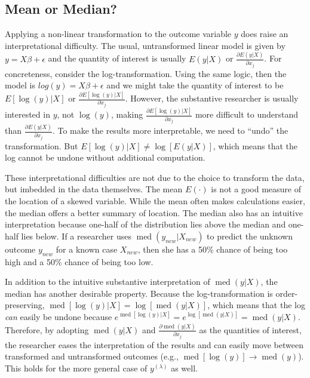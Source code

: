 \documentclass[12pt]{article}
\DeclareMathOperator{\med}{med}
\begin{document}
\subsection*{Mean or Median?}

Applying a non-linear transformation to the outcome variable $y$ does raise an interpretational difficulty. 
The usual, untransformed linear model is given by $y = X\beta + \epsilon$ and the quantity of interest is usually $E(y | X)$ or $\frac{\partial E(y | X)}{\partial x_j}$. 
For concreteness, consider the log-transformation. 
Using the same logic, then the model is $log(y) = X\beta + \epsilon$ and we might take the quantity of interest to be $E[\log(y) | X]$ or $\frac{\partial E[\log(y) | X]}{\partial x_j}$. 
However, the substantive researcher is usually interested in $y$, not $\log(y)$, making $\frac{\partial E[\log(y) | X]}{\partial x_j}$ more difficult to understand than $\frac{\partial E(y | X)}{\partial x_j}$. 
To make the results more interpretable, we need to ``undo'' the transformation. 
But $E[\log(y) | X] \neq \log [E(y | X)]$, which means that the log cannot be undone without additional computation.

These interpretational difficulties are not due to the choice to transform the data, but imbedded in the data themselves. 
The mean $E(\cdot)$ is not a good measure of the location of a skewed variable. 
While the mean often makes calculations easier, the median offers a better summary of location. 
The median also has an intuitive interpretation because one-half of the distribution lies above the median and one-half lies below. 
If a researcher uses $\med(y_{new} | X_{new})$ to predict the unknown outcome $y_{new}$ for a known case $X_{new}$, then she has a 50\% chance of being too high and a 50\% chance of being too low. 

In addition to the intuitive substantive interpretation of $\med(y | X)$, the median has another desirable property. 
Because the log-transformation is order-preserving, $\med[\log(y) | X] = \log [\med(y | X)]$, which means that the log \textit{can} easily be undone because $e^{\med[\log(y) | X]} = e^{\log[\med(y | X)]} = \med(y | X)$. 
Therefore, by adopting $\med(y | X)$ and $\frac{\partial \med(y | X)}{\partial x_j}$ as the quantities of interest, the researcher eases the interpretation of the results and can easily move between transformed and untransformed outcomes (e.g., $\med[\log(y)] \rightarrow \med(y)$). 
This holds for the more general case of $y^{(\lambda)}$ as well.
\end{document}
